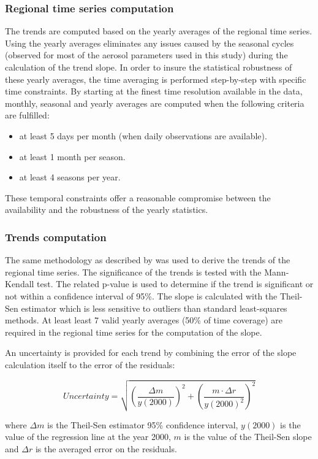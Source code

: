 \documentclass[journal abbreviation, manuscript]{copernicus}
\begin{document}
\subsubsection{Regional time series computation}
The trends are computed based on the yearly averages of the regional time series. Using the yearly averages eliminates any issues caused by the seasonal cycles (observed for most of the aerosol parameters used in this study) during the calculation of the trend slope. In order to insure the statistical robustness of these yearly averages, the time averaging is performed step-by-step with specific time constraints. By starting at the finest time resolution available in the data, monthly, seasonal and yearly averages are computed when the following criteria are fulfilled:
\begin{itemize}
 \item at least 5 days per month (when daily observations are available).
 \item at least 1 month per season.
 \item at least 4 seasons per year.
\end{itemize}
These temporal constraints offer a reasonable compromise between the availability and the robustness of the yearly statistics.

\subsubsection{Trends computation}
The same methodology as described by \cite{aas2019global} was used to derive the trends of the regional time series. The significance of the trends is tested with the Mann-Kendall test. The related p-value is used to determine if the trend is significant or not within a confidence interval of 95\%. The slope is calculated with the Theil-Sen estimator which is less sensitive to outliers than standard least-squares methods. At least least 7 valid yearly averages (50\% of time coverage) are required in the regional time series for the computation of the slope.

An uncertainty is provided for each trend by combining the error of the slope calculation itself to the error of the residuals:

\begin{equation}
 Uncertainty = \sqrt{{\left (\frac{\Delta m}{y(2000)}\right )}^{2} + {\left ( \frac{m \cdot \Delta r}{y(2000)^2}\right )}^{2} }
\end{equation}

where $\Delta m$ is the Theil-Sen estimator 95\% confidence interval, $y(2000)$ is the value of the regression line at the year 2000, $m$ is the value of the Theil-Sen slope and $\Delta r$ is the averaged error on the residuals.
\end{document}
